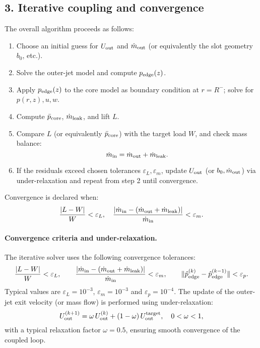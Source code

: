 \documentclass[11pt,a4paper]{article}
\begin{document}
\subsection*{3. Iterative coupling and convergence}
The overall algorithm proceeds as follows:
\begin{enumerate}
  \item Choose an initial guess for \(U_{\rm out}\) and \(\dot m_{\rm out}\) (or equivalently the slot geometry \(b_0\), etc.).  
  \item Solve the outer-jet model and compute \(p_{\rm edge}(z)\).  
  \item Apply \(p_{\rm edge}(z)\) to the core model as boundary condition at \(r=R^{-}\); solve for \(p(r,z),u,w\).  
  \item Compute \(\bar p_{\rm core}\), \(\dot m_{\rm leak}\), and lift \(L\).  
  \item Compare \(L\) (or equivalently \(\bar p_{\rm core}\)) with the target load \(W\), and check mass balance:  
    \[
      \dot m_{\rm in} = \dot m_{\rm out} + \dot m_{\rm leak}.
    \]
  \item If the residuals exceed chosen tolerances \(\varepsilon_L,\varepsilon_m\), update \(U_{\rm out}\) (or \(b_0,\dot m_{\rm out}\)) via under-relaxation and repeat from step 2 until convergence.  
\end{enumerate}
Convergence is declared when:
\[
  \frac{|L - W|}{W} < \varepsilon_L,\quad
  \frac{|\dot m_{\rm in} - (\dot m_{\rm out} + \dot m_{\rm leak})|}{\dot m_{\rm in}} < \varepsilon_m.
\]

\paragraph{Convergence criteria and under-relaxation.}
The iterative solver uses the following convergence tolerances:
\[
  \frac{|L - W|}{W} < \varepsilon_L,
  \qquad
  \frac{|\dot m_{\rm in} - (\dot m_{\rm out} + \dot m_{\rm leak})|}
       {\dot m_{\rm in}} < \varepsilon_m,
  \qquad
  \|\hat p_{\rm edge}^{(k)} - \hat p_{\rm edge}^{(k-1)}\|
       < \varepsilon_p.
\]
Typical values are $\varepsilon_L = 10^{-3}$, $\varepsilon_m = 10^{-3}$ and $\varepsilon_p = 10^{-4}$.  
The update of the outer-jet exit velocity (or mass flow) is performed using under-relaxation:
\[
  U_{\mathrm{out}}^{(k+1)} = \omega\,U_{\mathrm{out}}^{(k)} + (1-\omega)\,U_{\mathrm{out}}^{\rm target}, 
  \quad 0<\omega<1,
\]
with a typical relaxation factor $\omega = 0.5$, ensuring smooth convergence of the coupled loop.
\end{document}
